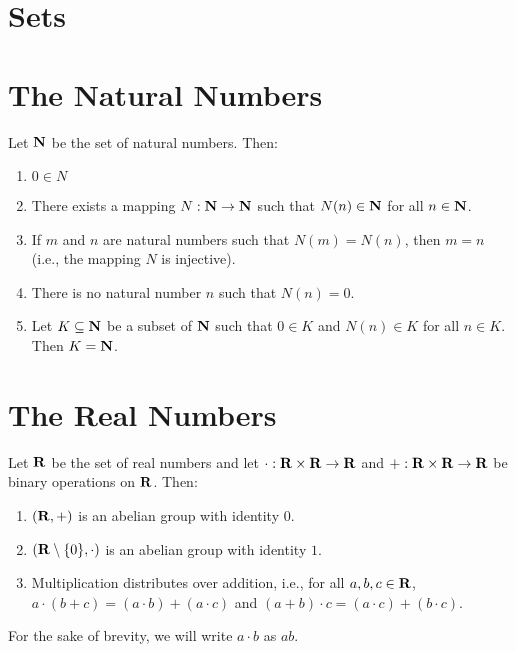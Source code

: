 \section{Sets}

\section{The Natural Numbers}

\begin{axiom}
    Let \(\mathbf{N}\) be the set of natural numbers. Then:
    \begin{enumerate}
        \item \(0 \in N\)
        \item There exists a mapping \(N: \mathbf{N} \to \mathbf{N}\) such that \(N(n) \in \mathbf{N}\) for all \(n \in \mathbf{N}\).
        \item If \(m\) and \(n\) are natural numbers such that \(N(m) = N(n)\), then \(m = n\) (i.e., the mapping \(N\) is injective).
        \item There is no natural number \(n\) such that \(N(n) = 0\).
        \item Let \(K \subseteq \mathbf{N}\) be a subset of \(\mathbf{N}\) such that \(0 \in K\) and \(N(n) \in K\) for all \(n \in K\). Then \(K = \mathbf{N}\).
    \end{enumerate}
\end{axiom}

\section{The Real Numbers}

\begin{axiom}
    Let \(\mathbf{R}\) be the set of real numbers and let \(\cdot: \mathbf{R} \times \mathbf{R} \to \mathbf{R}\) and \(+: \mathbf{R} \times \mathbf{R} \to \mathbf{R}\) be binary operations on \(\mathbf{R}\). Then:
    \begin{enumerate}
        \item \((\mathbf{R}, +)\) is an abelian group with identity \(0\).
        \item \((\mathbf{R} \setminus \{0\}, \cdot)\) is an abelian group with identity \(1\).
        \item Multiplication distributes over addition, i.e., for all \(a, b, c \in \mathbf{R}\), \(a \cdot (b + c) = (a \cdot b) + (a \cdot c)\) and \((a + b) \cdot c = (a \cdot c) + (b \cdot c)\).
    \end{enumerate}
\end{axiom}

For the sake of brevity, we will write \(a \cdot b\) as \(ab\).